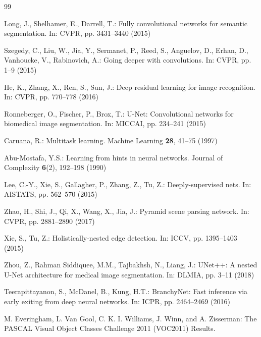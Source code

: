 \documentclass[runningheads]{llncs}
\begin{document}
%
\begin{thebibliography}{99}

Long, J., Shelhamer, E., Darrell, T.: Fully convolutional networks for semantic
segmentation. In: CVPR, pp. 3431--3440 (2015)

Szegedy, C., Liu, W., Jia, Y., Sermanet, P., Reed, S., Anguelov, D., Erhan, D.,
Vanhoucke, V., Rabinovich, A.: Going deeper with convolutions. In: CVPR,
pp. 1--9 (2015)

He, K., Zhang, X., Ren, S., Sun, J.: Deep residual learning for image
recognition. In: CVPR, pp. 770--778 (2016)

Ronneberger, O., Fischer, P., Brox, T.: U-Net: Convolutional networks for
biomedical image segmentation. In: MICCAI, pp. 234--241 (2015)

Caruana, R.: Multitask learning. Machine Learning \textbf{28}, 41--75 (1997)

Abu-Mostafa, Y.S.: Learning from hints in neural networks. Journal of
Complexity \textbf{6}(2), 192--198 (1990)


Lee, C.-Y., Xie, S., Gallagher, P., Zhang, Z., Tu, Z.: Deeply-supervised nets.
In: AISTATS, pp. 562--570 (2015)


Zhao, H., Shi, J., Qi, X., Wang, X., Jia, J.: Pyramid scene parsing network.
In: CVPR, pp. 2881--2890 (2017)

Xie, S., Tu, Z.: Holistically-nested edge detection. In: ICCV,
pp. 1395--1403 (2015)

Zhou, Z., Rahman Siddiquee, M.M., Tajbakhsh, N., Liang, J.: UNet++: A nested
U-Net architecture for medical image segmentation. In: DLMIA, pp. 3--11 (2018)

Teerapittayanon, S., McDanel, B., Kung, H.T.: BranchyNet: Fast inference via
early exiting from deep neural networks. In: ICPR, pp. 2464--2469 (2016)


M. Everingham, L. Van Gool, C. K. I. Williams, J. Winn,
and A. Zisserman: The PASCAL Visual Object Classes
Challenge 2011 (VOC2011) Results. 

\end{thebibliography}
\end{document}
